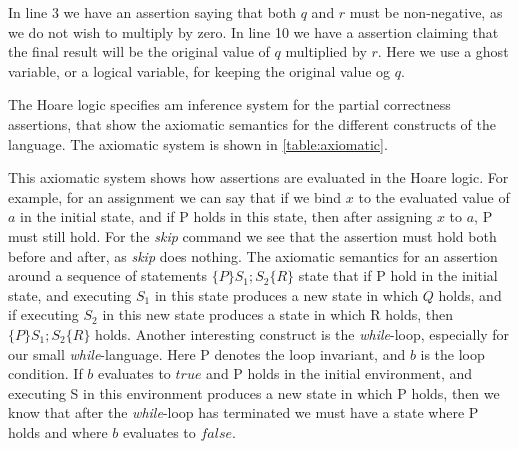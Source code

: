 In line 3 we have an assertion saying that both $q$ and $r$ must be non-negative, as we do not wish to multiply by zero.
In line 10 we have a assertion claiming that the final result will be the original value of $q$ multiplied by $r$. Here we use a ghost variable, or a logical variable, for keeping the original value og $q$.


The Hoare logic specifies am inference system for the partial correctness assertions, that show the axiomatic semantics for the different constructs of the language. The axiomatic system is shown in \autoref{table:axiomatic}.

This axiomatic system shows how assertions are evaluated in the Hoare logic. For example, for an assignment we can say that if we bind $x$ to the evaluated value of $a$ in the initial state, and if P holds in this state, then after assigning $x$ to $a$, P must still hold.
For the \textit{skip} command we see that the assertion must hold both before and after, as \textit{skip} does nothing.
The axiomatic semantics for an assertion around a sequence of statements $\{P\} S_1;S_2\{R\}$ state that if P hold in the initial state, and executing $S_1$ in this state produces a new state in which $Q$ holds, and if executing $S_2$ in this new state produces a state in which R holds, then $\{P\} S_1;S_2 \{R\}$ holds.
Another interesting construct is the \textit{while}-loop, especially for our small \textit{while}-language.
Here P denotes the loop invariant, and $b$ is the loop condition. If $b$ evaluates to $true$ and P holds in the initial environment, and executing S in this environment produces a new state in which P holds, then we know that after the \textit{while}-loop has terminated we must have a state where P holds and where $b$ evaluates to $false$.

